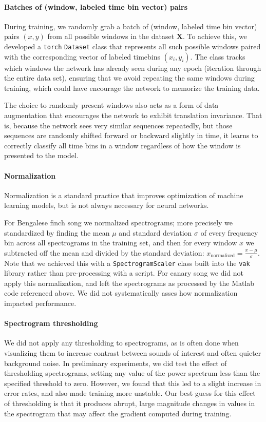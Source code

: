 \documentclass[9pt,lineno]{elife}
\begin{document}
\paragraph{Batches of (window, labeled time bin vector) pairs}

During training, we randomly grab a batch of 
(window, labeled time bin vector) pairs $(x, y)$
from all possible windows in the dataset $\textbf{X}$.
To achieve this, we developed a \texttt{torch} \texttt{Dataset} class 
that represents all such possible windows  
paired with the corresponding vector of labeled timebins $(x_i, y_i)$.
The class tracks which windows the network has already seen 
during any epoch (iteration through the entire data set),  
ensuring that we avoid repeating the same windows during training, 
which could have encourage the network to memorize the training data.

The choice to randomly present windows also acts as a form of data augmentation 
that encourages the network to exhibit translation invariance. 
That is, because the network sees very similar sequences repeatedly, 
but those sequences are randomly shifted forward or backward slightly in time, 
it learns to correctly classify all time bins in a window 
regardless of how the window is presented to the model. 

\paragraph{Normalization}
Normalization is a standard practice that improves optimization of machine learning models, 
but is not always necessary for neural networks. 

For Bengalese finch song we normalized spectrograms;  
more precisely we standardized 
by finding the mean $\mu$ and standard deviation $\sigma$ of every frequency bin 
across all spectrograms in the training set, 
and then for every window $x$ we subtracted off the mean and divided by the standard deviation:
$x_{\textrm{normalized}} = \frac{x - \mu}{\sigma}$.
Note that we achieved this with a \texttt{SpectrogramScaler} class 
built into the \texttt{vak} library rather than pre-processing with a script.
For canary song we did not apply this normalization, 
and left the spectrograms as processed by the Matlab code referenced above.
We did not systematically asses how normalization impacted performance.

\paragraph{Spectrogram thresholding}
We did not apply any thresholding to spectrograms, 
as is often done when visualizing them 
to increase contrast between sounds of interest and often quieter background noise.
In preliminary experiments, we did test the effect of thresholding spectrograms, 
setting any value of the power spectrum less than the specified threshold to zero. 
However, we found that this led to a slight increase in error rates,   
and also made training more unstable. 
Our best guess for this effect of thresholding 
is that it produces abrupt, large magnitude changes in values 
in the spectrogram that may affect the gradient 
computed during training.
\end{document}
